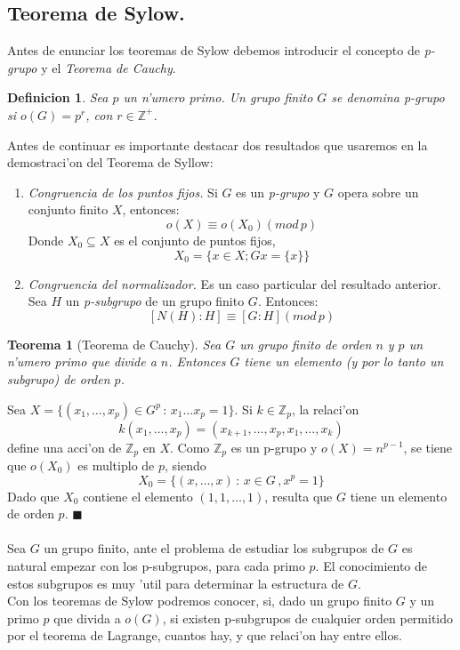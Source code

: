 \documentclass[a4paper,openright,12pt]{book}
\numberwithin{equation}{section} %
\newtheorem{teorema}{Teorema}[section] %
\newtheorem{definicion}{Definicion}[section] %
\newenvironment{proof}{\noindent{\it Demostracion:}}{\hfill$\blacksquare$} %
\begin{document}
\subsection{Teorema de Sylow.}
Antes de enunciar los teoremas de Sylow debemos introducir el concepto de \textit{p-grupo} y el \textit{Teorema de Cauchy}.
\begin{definicion}
Sea $p$ un n'umero primo. Un grupo finito $G$ se denomina \textit{p-grupo} si $o(G)=p^{r}$, con $r \in \mathbb{Z}^{+}$.
\end{definicion}
Antes de continuar es importante destacar dos resultados que usaremos en la demostraci'on del Teorema de Syllow:
\begin{enumerate}
\item \textit{Congruencia de los puntos fijos.} Si $G$ es un \textit{p-grupo} y $G$ opera sobre un conjunto finito $X$, entonces:
\[
o(X) \equiv o(X_{0}) (mod \, p)
\]
Donde $X_{0}\subseteq X$ es el conjunto de puntos fijos, 
\[
X_{0}=\{ x \in X ; Gx = \{x \} \}
\]
\item \textit{Congruencia del normalizador.} Es un caso particular del resultado anterior. Sea $H$ un \textit{p-subgrupo} de un grupo finito $G$. Entonces:
\[
[N(H):H] \equiv [G:H] (mod \, p) 
\]
\end{enumerate}
\begin{teorema}[Teorema de Cauchy]
Sea $G$ un grupo finito de orden $n$ y $p$ un n'umero primo que divide a $n$. Entonces $G$ tiene un elemento (y por lo tanto un subgrupo) de orden $p$.
\end{teorema}
\begin{proof}
Sea $X= \{ (x_{1},\ldots ,x_{p})\in G^{p}\, : \, x_{1}\ldots x_{p}=1\}$. Si $k \in \mathbb{Z}_{p}$, la relaci'on 
\[
k(x_{1},\ldots ,x_{p})=(x_{k+1},\ldots ,x_{p},x_{1},\ldots ,x_{k})
\]
define una acci'on de $\mathbb{Z}_{p}$ en $X$. Como $\mathbb{Z}_{p}$ es un p-grupo y $o(X)=n^{p-1}$, se tiene que $o(X_{0})$ es multiplo de $p$, siendo
\[
X_{0}=\{ (x,\ldots ,x)\, : \, x \in G \, ,x^{p}=1 \}
\]
Dado que $X_{0}$ contiene el elemento $(1, 1, \ldots ,1)$, resulta que $G$ tiene un elemento de orden $p$.
\end{proof}\\
\\
Sea $G$ un grupo finito, ante el problema de estudiar los subgrupos de $G$ es natural empezar con los p-subgrupos, para cada primo $p$. El conocimiento de estos subgrupos es muy 'util para determinar la estructura de $G$. \\
Con los teoremas de Sylow podremos conocer, si, dado un grupo finito $G$ y un primo $p$ que divida a $o(G)$, si existen p-subgrupos de cualquier orden permitido por el teorema de Lagrange, cuantos hay, y que relaci'on hay entre ellos. 
\end{document}
